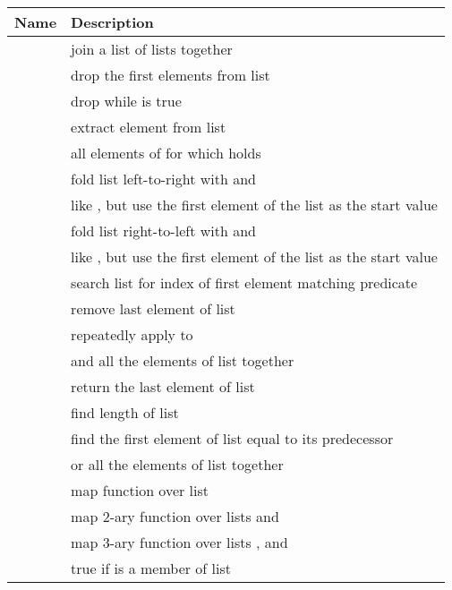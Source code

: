\begin{tab2}
\begin{center}
\begin{tabular}{||l|l||}
\hline
Name & Description \\
\hline
\ct{concat l} 		& join a list of lists together \\
\ct{drop n l} 		& drop the first \ct{n} elements from list \ct{l} \\
\ct{dropwhile fn l} 	& drop while \ct{fn} is true \\
\ct{extract n l} 	& extract element \ct{n} from list \ct{l} \\
\ct{filter fn l} 	& all elements of \ct{l} for which \ct{fn} holds \\
\ct{foldl fn st l} 	& fold list \ct{l} left-to-right with \ct{fn} 
			  and \ct{st} \\
\ct{foldl1 fn l} 	& like \ct{foldl}, but use the first element of the 
			  list as the start value \\
\ct{foldr fn st l} 	& fold list \ct{l} right-to-left with \ct{fn} 
			  and \ct{st} \\
\ct{foldr1 fn l} 	& like \ct{foldr}, but use the first element of the 
			  list as the start value \\
\ct{index fn l} 	& search list \ct{l} for index of first element 
			  matching predicate \ct{fn} \\
\ct{init l} 		& remove last element of list \ct{l} \\
\ct{iterate f x} 	& repeatedly apply \ct{f} to \ct{x} \\
\ct{land l} 		& and all the elements of list \ct{l} together \\
\ct{last l} 		& return the last element of list \ct{l} \\
\ct{len l} 		& find length of list \ct{l} \\
\ct{limit l}		& find the first element of list \ct{l} equal to
			  its predecessor \\
\ct{lor l} 		& or all the elements of list \ct{l} together \\
\ct{map fn l} 		& map function \ct{fn} over list \ct{l} \\
\ct{map2 fn l1 l2} 	& map 2-ary function \ct{fn} over lists \ct{l1}
		 	  and \ct{l2} \\
\ct{map3 fn l1 l2 l3} 	& map 3-ary function \ct{fn} over lists \ct{l1},
		 	  \ct{l2} and \ct{l3} \\
\ct{member l x}		& true if \ct{x} is a member of list \ct{l} \\

\end{tabular}
\end{center}
\end{tab2}
